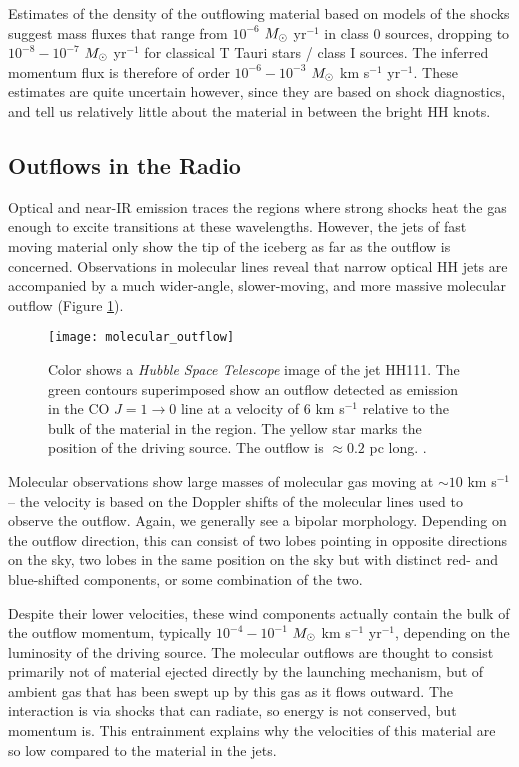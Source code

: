 Estimates of the density of the outflowing material based on models of the shocks suggest mass fluxes that range from $10^{-6}$ $M_{\odot}$ yr$^{-1}$ in class 0 sources, dropping to $10^{-8}-10^{-7}$ $M_{\odot}$ yr$^{-1}$ for classical T Tauri stars / class I sources. The inferred momentum flux is therefore of order $10^{-6}-10^{-3}$ $M_{\odot}$ km s$^{-1}$ yr$^{-1}$. These estimates are quite uncertain however, since they are based on shock diagnostics, and tell us relatively little about the material in between the bright HH knots.


\subsection{Outflows in the Radio}

Optical and near-IR emission traces the regions where strong shocks heat the gas enough to excite transitions at these wavelengths. However, the jets of fast moving material only show the tip of the iceberg as far as the outflow is concerned. Observations in molecular lines reveal that narrow optical HH jets are accompanied by a much wider-angle, slower-moving, and more massive molecular outflow (Figure \ref{fig:molecular_outflow}).

\begin{figure}
\texttt{[image: molecular\_outflow]}
\caption[A molecular outflow in HH111]{
\label{fig:molecular_outflow}
Color shows a \textit{Hubble Space Telescope} image of the jet HH111. The green contours superimposed show an outflow detected as emission in the CO $J=1\rightarrow 0$ line at a velocity of 6 km s$^{-1}$ relative to the bulk of the material in the region. The yellow star marks the position of the driving source. The outflow is $\approx 0.2$ pc long. \citep{mckee07a}. 
}
\end{figure}

Molecular observations show large masses of molecular gas moving at $\sim 10$ km s$^{-1}$ -- the velocity is based on the Doppler shifts of the molecular lines used to observe the outflow. Again, we generally see a bipolar morphology. Depending on the outflow direction, this can consist of two lobes pointing in opposite directions on the sky, two lobes in the same position on the sky but with distinct red- and blue-shifted components, or some combination of the two.

Despite their lower velocities, these wind components actually contain the bulk of the outflow momentum, typically $10^{-4}-10^{-1}$ $M_{\odot}$ km s$^{-1}$ yr$^{-1}$, depending on the luminosity of the driving source. The molecular outflows are thought to consist primarily not of material ejected directly by the launching mechanism, but of ambient gas that has been swept up by this gas as it flows outward. The interaction is via shocks that can radiate, so energy is not conserved, but momentum is. This entrainment explains why the velocities of this material are so low compared to the material in the jets.

